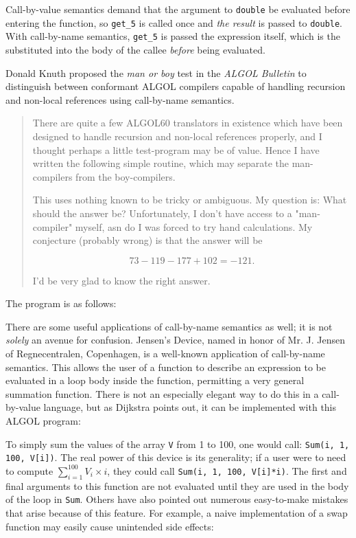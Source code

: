 Call-by-value semantics demand that the argument to \texttt{double} be evaluated
before entering the function, so \texttt{get\_5} is called once and
\textit{the result} is passed to \texttt{double}.
With call-by-name semantics, \texttt{get\_5} is passed the expression itself,
which is the substituted into the body of the callee \textit{before}
being evaluated.

Donald Knuth proposed the \textit{man or boy} test in the \textit{ALGOL Bulletin}
to distinguish between
conformant ALGOL compilers capable of handling recursion and non-local references
using call-by-name semantics\cite{Knuth1964ManOrBoy}.

\begin{quotation}
There are quite a few ALGOL60 translators in existence which have been designed 
to handle recursion and non-local references properly, and I thought perhaps a 
little test-program may be of value. Hence I have written the following simple 
routine, which may separate the man-compilers from the boy-compilers.

This uses nothing known to be tricky or ambiguous. My question is: What should 
the answer be? Unfortunately, I don't have access to a "man-compiler" myself, 
asn do I was forced to try hand calculations. My conjecture (probably wrong) is 
that the answer will be

\[
73 - 119 - 177 + 102 = -121 .
\]

I'd be very glad to know the right answer.
\end{quotation}

The program is as follows:



There are some useful applications of call-by-name semantics as well;
it is not \textit{solely} an avenue for confusion.
Jensen's Device, named in honor of Mr. J. Jensen of Regnecentralen, Copenhagen,
is a well-known application of call-by-name semantics.
This allows the user of a function to describe an expression to be evaluated
in a loop body inside the function, permitting a very general summation function.
There is not an especially elegant way to do this in a call-by-value language,
but as Dijkstra points out\cite{dijkstra_defense_of_algol_60_1961},
it can be implemented with this ALGOL program:



To simply sum the values of the array \texttt{V} from 1 to 100, one would call:
\texttt{Sum(i, 1, 100, V[i])}.
The real power of this device is its generality;
if a user were to need to compute $\sum_{i=1}^{100} V_{i}\times i$,
they could call \texttt{Sum(i, 1, 100, V[i]*i)}.
The first and final arguments to this function are not evaluated
until they are used in the body of the loop in \texttt{Sum}.
Others have also pointed out numerous easy-to-make mistakes
that arise because of this feature.
For example, a naive implementation of a swap function may easily
cause unintended side effects:

